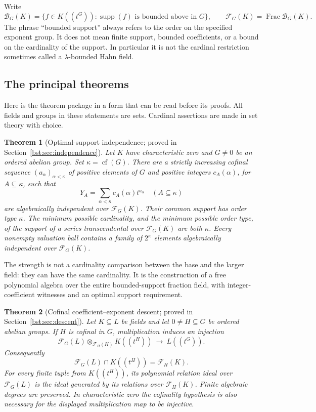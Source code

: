 \documentclass[11pt,letterpaper]{article}
\newtheorem{theorem}{Theorem}[section]
\theoremstyle{definition}
\theoremstyle{remark}
\newcommand{\supp}{\operatorname{supp}}
\newcommand{\Frac}{\operatorname{Frac}}
\newcommand{\cof}{\operatorname{cf}}
\newcommand{\HH}[2]{#1((t^{#2}))}
\newcommand{\BB}[2]{\mathcal B_{#2}(#1)}
\newcommand{\FF}[2]{\mathcal F_{#2}(#1)}
\begin{document}
Write
\begin{equation}\label{bst:eq:base}
 \BB KG=\{f\in\HH KG:\supp(f)\text{ is bounded above in }G\},
 \qquad \FF KG=\Frac\BB KG.
\end{equation}
The phrase ``bounded support'' always refers to the order on the specified
exponent group. It does not mean finite support, bounded coefficients, or a
bound on the cardinality of the support. In particular it is not the
cardinal restriction sometimes called a $\lambda$-bounded Hahn field.

\subsection{The principal theorems}

Here is the theorem package in a form that can be read before its proofs.
All fields and groups in these statements are sets. Cardinal assertions are
made in set theory with choice.

\begin{theorem}[Optimal-support independence; proved in Section~\ref{bst:sec:independence}]
\label{bst:thm:mainintro}
Let $K$ have characteristic zero and $G\ne0$ be an ordered abelian group.
Set $\kappa=\cof(G)$. There are a strictly increasing cofinal sequence
$(a_\alpha)_{\alpha<\kappa}$ of positive elements of $G$ and positive integers
$c_A(\alpha)$, for $A\subseteq\kappa$, such that
\[
 Y_A=\sum_{\alpha<\kappa}c_A(\alpha)t^{a_\alpha}
 \quad(A\subseteq\kappa)
\]
are algebraically independent over $\FF KG$. Their common support has order
type $\kappa$. The minimum possible cardinality, and the minimum possible
order type, of the support of a series transcendental over $\FF KG$ are both
$\kappa$. Every nonempty valuation ball contains a family of $2^\kappa$
elements algebraically independent over $\FF KG$.
\end{theorem}

The strength is not a cardinality comparison between the base and the larger
field: they can have the same cardinality. It is the construction of a free
polynomial algebra over the entire bounded-support fraction field, with
integer-coefficient witnesses and an optimal support requirement.

\begin{theorem}[Cofinal coefficient--exponent descent; proved in Section~\ref{bst:sec:descent}]
\label{bst:thm:descentintro}
Let $K\subseteq L$ be fields and let $0\ne H\subseteq G$ be ordered abelian
groups. If $H$ is cofinal in $G$, multiplication induces an injection
\[
 \FF LG\otimes_{\FF KH}\HH KH\ \longrightarrow\ \HH LG.
\]
Consequently
\[
 \FF LG\cap\HH KH=\FF KH.
\]
For every finite tuple from $\HH KH$, its polynomial relation ideal over
$\FF LG$ is the ideal generated by its relations over $\FF KH$.
Finite algebraic degrees are preserved. In characteristic zero the cofinality hypothesis is
also necessary for the displayed multiplication map to be injective.
\end{theorem}
\end{document}
